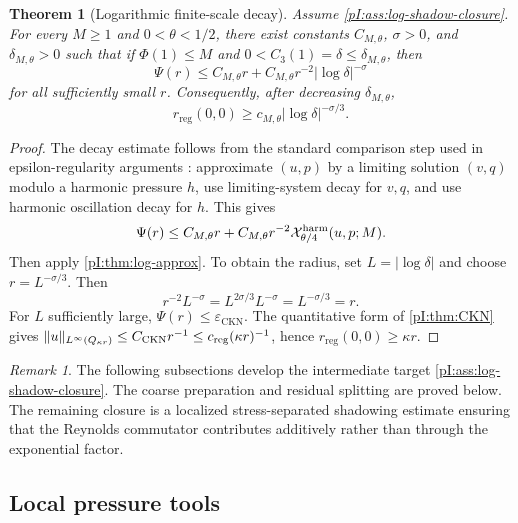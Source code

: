 \documentclass[11pt]{article}
\numberwithin{equation}{section}
\theoremstyle{plain}
\newtheorem{theorem}{Theorem}[section]
\theoremstyle{definition}
\theoremstyle{remark}
\newtheorem{remark}{Remark}[section]
\newcommand{\eps}{\varepsilon}
\newcommand{\reg}{\mathrm{reg}}
\newcommand{\CKN}{\mathrm{CKN}}
\newcommand{\calX}{\mathcal X}
\begin{document}
\begin{theorem}[Logarithmic finite-scale decay]\label{pI:thm:log-decay}
Assume \cref{pI:ass:log-shadow-closure}.  For every \(M\ge1\) and \(0<\theta<1/2\), there exist constants \(C_{M,\theta}\), \(\sigma>0\), and \(\delta_{M,\theta}>0\) such that if \(\Phi(1)\le M\) and \(0<C_3(1)=\delta\le\delta_{M,\theta}\), then
\begin{equation}\label{pI:eq:log-decay}
        \Psi(r)
        \le C_{M,\theta}r+C_{M,\theta}r^{-2}|\log\delta|^{-\sigma}
\end{equation}
for all sufficiently small \(r\).  Consequently, after decreasing \(\delta_{M,\theta}\),
\begin{equation}\label{pI:eq:log-radius}
        r_{\reg}(0,0)
        \ge c_{M,\theta}|\log\delta|^{-\sigma/3}.
\end{equation}
\end{theorem}

\begin{proof}
The decay estimate follows from the standard comparison step used in epsilon-regularity arguments \cite{CKN1982,Lin1998,Seregin2015}: approximate \((u,p)\) by a limiting solution \((v,q)\) modulo a harmonic pressure \(h\), use limiting-system decay for \(v,q\), and use harmonic oscillation decay for \(h\).  This gives
\[
        \Psi(r)\le C_{M,\theta}r+C_{M,\theta}r^{-2}\calX^{\rm harm}_{\theta/4}(u,p;M).
\]
Then apply \cref{pI:thm:log-approx}.  To obtain the radius, set \(L=|\log\delta|\) and choose \(r=L^{-\sigma/3}\).  Then
\[
        r^{-2}L^{-\sigma}=L^{2\sigma/3}L^{-\sigma}=L^{-\sigma/3}=r.
\]
For \(L\) sufficiently large, \(\Psi(r)\le\eps_{\CKN}\).  The quantitative form of \cref{pI:thm:CKN} gives \(\|u\|_{L^\infty(Q_{\kappa r})}\le C_{\CKN}r^{-1}\le c_{\rm reg}(\kappa r)^{-1}\), hence \(r_{\reg}(0,0)\ge\kappa r\).
\end{proof}

\begin{remark}
The following subsections develop the intermediate target \cref{pI:ass:log-shadow-closure}.  The coarse preparation and residual splitting are proved below.  The remaining closure is a localized stress-separated shadowing estimate ensuring that the Reynolds commutator contributes additively rather than through the exponential factor.
\end{remark}

\subsection{Local pressure tools}\label{pI:sec:pressure-tools}
\end{document}
